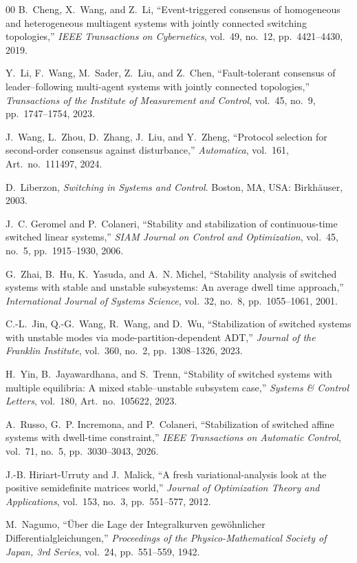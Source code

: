 \documentclass[conference]{IEEEtran}
\begin{document}
\begin{thebibliography}{00}
		B.~Cheng, X.~Wang, and Z.~Li,
		``Event-triggered consensus of homogeneous and heterogeneous
		multiagent systems with jointly connected switching topologies,''
		\emph{IEEE Transactions on Cybernetics},
		vol.~49, no.~12, pp.~4421--4430, 2019.
		
		Y.~Li, F.~Wang, M.~Sader, Z.~Liu, and Z.~Chen,
		``Fault-tolerant consensus of leader--following multi-agent systems
		with jointly connected topologies,''
		\emph{Transactions of the Institute of Measurement and Control},
		vol.~45, no.~9, pp.~1747--1754, 2023.
		
		J.~Wang, L.~Zhou, D.~Zhang, J.~Liu, and Y.~Zheng,
		``Protocol selection for second-order consensus against
		disturbance,''
		\emph{Automatica},
		vol.~161, Art.~no.~111497, 2024.
		
		D.~Liberzon,
		\emph{Switching in Systems and Control}.
		Boston, MA, USA: Birkh\"auser, 2003.
		
		J.~C. Geromel and P.~Colaneri,
		``Stability and stabilization of continuous-time switched linear
		systems,''
		\emph{SIAM Journal on Control and Optimization},
		vol.~45, no.~5, pp.~1915--1930, 2006.
		
		G.~Zhai, B.~Hu, K.~Yasuda, and A.~N. Michel,
		``Stability analysis of switched systems with stable and unstable
		subsystems: An average dwell time approach,''
		\emph{International Journal of Systems Science},
		vol.~32, no.~8, pp.~1055--1061, 2001.
		
		C.-L.~Jin, Q.-G.~Wang, R.~Wang, and D.~Wu,
		``Stabilization of switched systems with unstable modes via
		mode-partition-dependent ADT,''
		\emph{Journal of the Franklin Institute},
		vol.~360, no.~2, pp.~1308--1326, 2023.
		
		H.~Yin, B.~Jayawardhana, and S.~Trenn,
		``Stability of switched systems with multiple equilibria:
		A mixed stable--unstable subsystem case,''
		\emph{Systems \& Control Letters},
		vol.~180, Art.~no.~105622, 2023.
		
		A.~Russo, G.~P. Incremona, and P.~Colaneri,
		``Stabilization of switched affine systems with dwell-time
		constraint,''
		\emph{IEEE Transactions on Automatic Control},
		vol.~71, no.~5, pp.~3030--3043, 2026.
		
		J.-B. Hiriart-Urruty and J.~Malick,
		``A fresh variational-analysis look at the positive semidefinite
		matrices world,''
		\emph{Journal of Optimization Theory and Applications},
		vol.~153, no.~3, pp.~551--577, 2012.
		
		M.~Nagumo,
		``\"Uber die Lage der Integralkurven gew\"ohnlicher
		Differentialgleichungen,''
		\emph{Proceedings of the Physico-Mathematical Society of Japan,
			3rd Series},
		vol.~24, pp.~551--559, 1942.
		
	\end{thebibliography}
	
\end{document}
